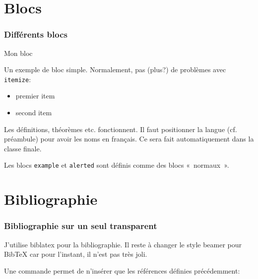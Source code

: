 \documentclass{beamer}
\begin{document}
\section{Blocs}
\label{sec:blocs}

\begin{frame}
\frametitle{Différents blocs}

\vfill

\begin{block}{Mon bloc}

Un exemple de bloc simple. Normalement, pas (plus?) de problèmes avec
\texttt{itemize}:

\begin{itemize}
\item premier item
\item second item
\end{itemize}  
\end{block}

\vfill

\begin{definition}[Ma définition]
Les définitions, théorèmes etc. fonctionnent. Il faut positionner la
langue (cf. préambule) pour avoir les noms en français. Ce sera fait
automatiquement dans la classe finale.
\end{definition}

\vfill

\begin{example}
Les blocs \texttt{example} et \texttt{alerted} sont définis comme des
blocs «~normaux~».
\end{example}

\vfill

\end{frame}

\section{Bibliographie}
\label{sec:biblio}

\begin{frame}
\frametitle{Bibliographie sur un seul transparent}

J'utilise biblatex pour la bibliographie. Il reste à changer le style
beamer pour BibTeX car pour l'instant, il n'est pas très joli.

Une commande permet de n'insérer que les références définies
précédemment:

\vspace{1cm}


\end{frame}
\end{document}
